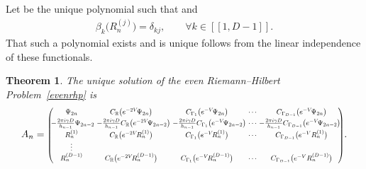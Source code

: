 \documentclass[11pt]{article}
\numberwithin{equation}{section}
\numberwithin{equation}{section}
\newtheorem{Theorem}{Theorem}[section]
\begin{document}
Let  be the unique polynomial such that
and
\begin{align*}
\beta_k\big(R^{(j)}_n\big) = \delta_{kj},\qquad \forall k \in [\![ 1, D-1 ]\!].
\end{align*}
That such a polynomial exists and is unique follows from the linear independence of these functionals.

\begin{Theorem}
The unique solution of the \textit{even} Riemann--Hilbert Problem~{\rm \ref{evenrhp}} is
\begin{gather*}%
A_{n}
=\resizebox{.87\hsize}{!}{$\left(\begin{matrix}
\Psi_{2n} & C_\mathbb{R}\big({\rm e}^{-2V}\!\Psi_{2n}\big) & C_{\Gamma_1}\big({\rm e}^{-V}\!\Psi_{2n}\big) &\cdots & C_{\Gamma_{D-1}}\big({\rm e}^{-V}\!\Psi_{2n}\big) \\[1mm]
\!\!- \frac{2\pi {\rm i} \gamma D}{h_{n-1}}\Psi_{2n-2}\!\!\!\! & - \frac{2\pi {\rm i} \gamma D}{h_{n-1}} C_\mathbb{R}\big({\rm e}^{-2V}\!\Psi_{2n-2}\big)\!\!\!\! & - \frac{2\pi {\rm i} \gamma D}{h_{n-1}} C_{\Gamma_1}\big({\rm e}^{-V}\!\Psi_{2n-2}\big)\!\!\!\! & \cdots & \!\!\!\!\!- \frac{2\pi {\rm i} \gamma D}{h_{n-1}} C_{\Gamma_{D-1}}\big({\rm e}^{-V}\!\Psi_{2n-2}\big) \!\!\\[1mm]
R^{(1)}_n & C_\mathbb{R}\big({\rm e}^{-2V}\!R^{(1)}_n\big) & C_{\Gamma_1}\big({\rm e}^{-V}\!R^{(1)}_n\big) & \cdots & C_{\Gamma_{D-1}}\big({\rm e}^{-V}R^{(1)}_n\big) \\
\vdots \\
R^{(D-1)}_n & C_\mathbb{R}\big({\rm e}^{-2V}\!R^{(D-1)}_n \big) & C_{\Gamma_1}\big({\rm e}^{-V}\!R^{(D-1)}_n \big) & \cdots & C_{\Gamma_{D-1}}\big({\rm e}^{-V}R^{(D-1)}_n \big) \\
\end{matrix}\right)$}.
\end{gather*}
\end{Theorem}
\end{document}
